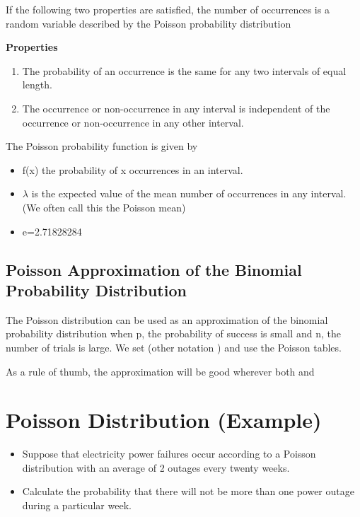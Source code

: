 \documentclass[]{article}
\begin{document}
If the following two properties are satisfied, the number of occurrences is a random variable described by the Poisson probability distribution

\textbf{Properties}
\begin{enumerate}
\item      The probability of an occurrence is the same for any two intervals of equal length.\\
\item   The occurrence or non-occurrence in any interval is independent of the occurrence or non-occurrence in any other interval.
\end{enumerate}

The Poisson probability function is given by



\begin{itemize} 
	\item	f(x) the probability of x occurrences in an interval. 
	\item	$\lambda$ is the expected value of the mean number of occurrences in any interval. (We often call this the Poisson mean)
	\item	e=2.71828284
\end{itemize} 


\subsection{Poisson Approximation of the Binomial Probability Distribution}

The Poisson distribution can be used  as an approximation of the binomial probability distribution when p, the probability of success is small and n, the number of trials is large.
We set   (other notation  )  and use the Poisson tables. 

As a rule of thumb, the approximation will be good wherever both  and  



\section{Poisson Distribution (Example)}
	\begin{itemize}
		
		\item Suppose that electricity power failures occur according to a Poisson distribution
		with an average of 2 outages every twenty weeks. \item Calculate the probability that there will
		not be more than one power outage during a particular week.
	\end{itemize}
	
\end{document}
